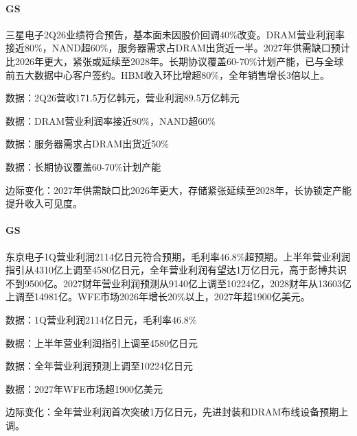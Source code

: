 \documentclass[11pt]{ctexart}
\begin{document}
\paragraph{GS} 三星电子2Q26业绩符合预告，基本面未因股价回调40\%改变。DRAM营业利润率接近80\%，NAND超60\%，服务器需求占DRAM出货近一半。2027年供需缺口预计比2026年更大，紧张或延续至2028年。长期协议覆盖60-70\%计划产能，已与全球前五大数据中心客户签约。HBM收入环比增超80\%，全年销售增长3倍以上。
{\small\color{refgray}数据：2Q26营收171.5万亿韩元，营业利润89.5万亿韩元\par}
{\small\color{refgray}数据：DRAM营业利润率接近80\%，NAND超60\%\par}
{\small\color{refgray}数据：服务器需求占DRAM出货近50\%\par}
{\small\color{refgray}数据：长期协议覆盖60-70\%计划产能\par}
{\small\color{refgray}边际变化：2027年供需缺口比2026年更大，存储紧张延续至2028年，长协锁定产能提升收入可见度。\par}
\paragraph{GS} 东京电子1Q营业利润2114亿日元符合预期，毛利率46.8\%超预期。上半年营业利润指引从4310亿上调至4580亿日元，全年营业利润有望达1万亿日元，高于彭博共识不到9500亿。2027财年营业利润预测从9140亿上调至10224亿，2028财年从13603亿上调至14981亿。WFE市场2026年增长20\%以上，2027年超1900亿美元。
{\small\color{refgray}数据：1Q营业利润2114亿日元，毛利率46.8\%\par}
{\small\color{refgray}数据：上半年营业利润指引上调至4580亿日元\par}
{\small\color{refgray}数据：全年营业利润预测上调至10224亿日元\par}
{\small\color{refgray}数据：2027年WFE市场超1900亿美元\par}
{\small\color{refgray}边际变化：全年营业利润首次突破1万亿日元，先进封装和DRAM布线设备预期上调。\par}
\end{document}
